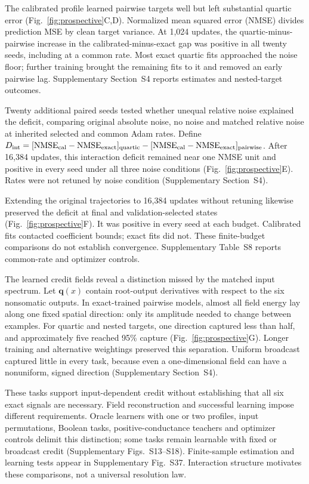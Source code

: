 \documentclass[11pt]{article}
\begin{document}
The calibrated profile learned pairwise targets well but left substantial quartic error (Fig.~\ref{fig:prospective}C,D). Normalized mean squared error (NMSE) divides prediction MSE by clean target variance. At 1,024 updates, the quartic-minus-pairwise increase in the calibrated-minus-exact gap was positive in all twenty seeds, including at a common rate. Most exact quartic fits approached the noise floor; further training brought the remaining fits to it and removed an early pairwise lag. Supplementary Section~S4 reports estimates and nested-target outcomes.

Twenty additional paired seeds tested whether unequal relative noise explained the deficit, comparing original absolute noise, no noise and matched relative noise at inherited selected and common Adam rates. Define $D_{\rm int}=[\mathrm{NMSE}_{\rm cal}-\mathrm{NMSE}_{\rm exact}]_{\rm quartic}-[\mathrm{NMSE}_{\rm cal}-\mathrm{NMSE}_{\rm exact}]_{\rm pairwise}$. After 16,384 updates, this interaction deficit remained near one NMSE unit and positive in every seed under all three noise conditions (Fig.~\ref{fig:prospective}E). Rates were not retuned by noise condition (Supplementary Section~S4).

Extending the original trajectories to 16,384 updates without retuning likewise preserved the deficit at final and validation-selected states (Fig.~\ref{fig:prospective}F). It was positive in every seed at each budget. Calibrated fits contacted coefficient bounds; exact fits did not. These finite-budget comparisons do not establish convergence. Supplementary Table~S8 reports common-rate and optimizer controls.

The learned credit fields reveal a distinction missed by the matched input spectrum. Let $\bm q(x)$ contain root-output derivatives with respect to the six nonsomatic outputs. In exact-trained pairwise models, almost all field energy lay along one fixed spatial direction: only its amplitude needed to change between examples. For quartic and nested targets, one direction captured less than half, and approximately five reached 95\% capture (Fig.~\ref{fig:prospective}G). Longer training and alternative weightings preserved this separation. Uniform broadcast captured little in every task, because even a one-dimensional field can have a nonuniform, signed direction (Supplementary Section~S4).

These tasks support input-dependent credit without establishing that all six exact signals are necessary. Field reconstruction and successful learning impose different requirements. Oracle learners with one or two profiles, input permutations, Boolean tasks, positive-conductance teachers and optimizer controls delimit this distinction; some tasks remain learnable with fixed or broadcast credit (Supplementary Figs.~S13--S18). Finite-sample estimation and learning tests appear in Supplementary Fig.~S37. Interaction structure motivates these comparisons, not a universal resolution law.
\end{document}
